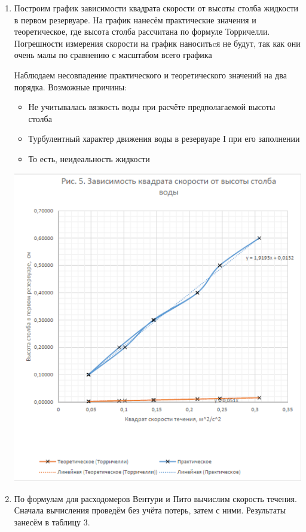 \documentclass{article}
\begin{document}
\begin{enumerate}
\begin{table}[h]
\end{table}
\item Построим график зависимости квадрата скорости от высоты столба жидкости в первом резервуаре. На график нанесём практические значения и теоретическое, где высота столба рассчитана по формуле Торричелли. Погрешности измерения скорости на график наноситьcя не будут, так как они очень малы по сравнению с масштабом всего графика


Наблюдаем несовпадение практического и теоретического значений на два порядка. Возможные причины:
\begin{itemize}
  \item Не учитывалась вязкость воды при расчёте предполагаемой высоты столба
  \item Турбулентный характер движения воды в резервуаре I при его заполнении
  \item То есть, неидеальность жидкости
\end{itemize}
\begin{center}
\includegraphics[width=\textwidth]{wrong_torr.PNG}
\end{center}

\item По формулам для расходомеров Вентури и Пито вычислим скорость течения. Сначала вычисления проведём без учёта потерь, затем с ними. Результаты занесём в таблицу 3.


\end{enumerate}
\end{document}
